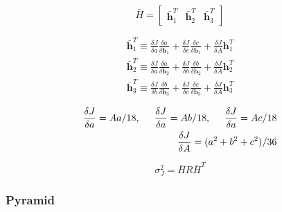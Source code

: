 \documentclass[12pt,a4paper,oneside]{article}
\begin{document}
\begin{equation}
\bar{H} = \begin{bmatrix}
\bar{\bm{h}}_1^T & \bar{\bm{h}}_2^T & \bar{\bm{h}}_3^T
\end{bmatrix}
\end{equation}

\begin{subequations}
\begin{align*}
\bar{\bm{h}}_1^T \equiv \frac{\delta J}{\delta a}\frac{\delta a}{\delta\bm{b}_1} + \frac{\delta J}{\delta c}\frac{\delta c}{\delta\bm{b}_1} + \frac{\delta J}{\delta A}\bm{h}_1^T\\
\bar{\bm{h}}_2^T \equiv \frac{\delta J}{\delta a}\frac{\delta a}{\delta\bm{b}_2} + \frac{\delta J}{\delta b}\frac{\delta b}{\delta\bm{b}_2} + \frac{\delta J}{\delta A}\bm{h}_2^T \\
\bar{\bm{h}}_3^T \equiv \frac{\delta J}{\delta b}\frac{\delta b}{\delta\bm{b}_3} + \frac{\delta J}{\delta c}\frac{\delta c}{\delta\bm{b}_3} + \frac{\delta J}{\delta A}\bm{h}_3^T
\end{align*}
\end{subequations}

\begin{subequations}
\begin{align*}
\frac{\delta J}{\delta a} = A a/18, \hspace{0.5cm} \frac{\delta J}{\delta a} = A b/18, \hspace{0.5cm} \frac{\delta J}{\delta a} = A c/18 \\
\frac{\delta J}{\delta A} = (a^2 + b^2 + c^2)/36
\end{align*}
\end{subequations}

\begin{equation}
\sigma_J^2 = \bar{H}R\bar{H}^T
\end{equation}

\subsubsection{Pyramid}
\end{document}
